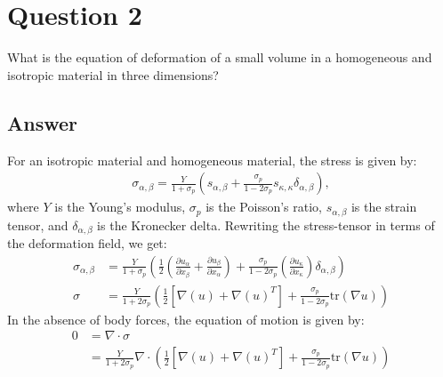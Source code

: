\documentclass{article}
\begin{document}
\section*{Question 2}
What is the equation of deformation of a small volume in a homogeneous and isotropic material in three dimensions?

\subsection*{Answer}
For an isotropic material and homogeneous material, the stress is given by:
\begin{align*}
    \sigma_{\alpha,\beta} = \frac{Y}{1+\sigma_p}\left(s_{\alpha,\beta} + \frac{\sigma_p}{1-2\sigma_p}s_{\kappa, \kappa}\delta_{\alpha,\beta}\right),
\end{align*}where $Y$ is the Young's modulus, $\sigma_p$ is the Poisson's ratio, $s_{\alpha,\beta}$ is the strain tensor, and $\delta_{\alpha,\beta}$ is the Kronecker delta.
Rewriting the stress-tensor in terms of the deformation field, we get:
\begin{align*}
    \sigma_{\alpha,\beta} &= \frac{Y}{1+\sigma_p}\left(\frac{1}{2}\left(\frac{\partial u_\alpha}{\partial x_\beta} + \frac{\partial u_\beta}{\partial x_\alpha}\right) + \frac{\sigma_p}{1-2\sigma_p}\left(\frac{\partial u_\kappa}{\partial x_\kappa}\right)\delta_{\alpha,\beta}\right)\\
    \sigma &= \frac{Y}{1 + 2\sigma_p}\left(\frac{1}{2}\left[\nabla(u) + \nabla(u)^T\right] + \frac{\sigma_p}{1-2\sigma_p}\text{tr}(\nabla u)\right)
\end{align*} In the absence of body forces, the equation of motion is given by:
\begin{align*}
    0 &= \nabla\cdot \sigma\\
    &= \frac{Y}{1 + 2\sigma_p}\nabla\cdot\left(\frac{1}{2}\left[\nabla(u) + \nabla(u)^T\right] + \frac{\sigma_p}{1-2\sigma_p}\text{tr}(\nabla u)\right)
\end{align*}
\end{document}

